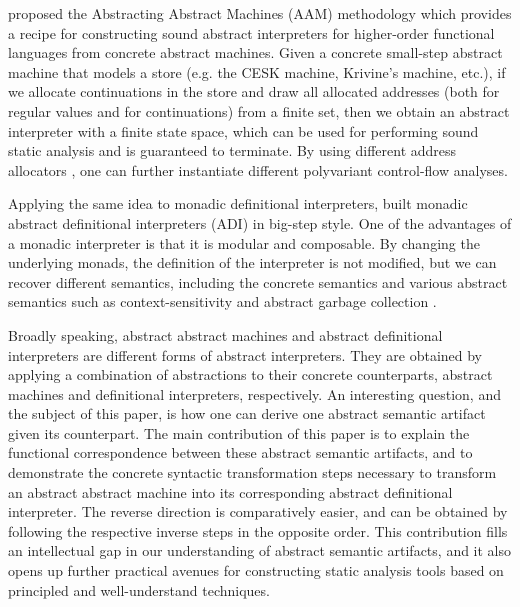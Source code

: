 \documentclass[acmsmall, review]{acmart}\settopmatter{}
\begin{document}
 proposed the Abstracting Abstract Machines (AAM)
methodology which provides a recipe for constructing sound abstract interpreters
for higher-order functional languages from concrete abstract machines.
Given a concrete small-step abstract machine that models a store 
(e.g. the CESK machine, Krivine's machine, etc.), if we allocate continuations 
in the store and draw all allocated addresses (both for regular values and 
for continuations) from a finite set, then
we obtain an abstract interpreter with a finite state space, which can be used for 
performing sound static analysis and is guaranteed to terminate.
By using different address allocators \cite{Gilray:2016:ACP:2951913.2951936},
one can further instantiate different polyvariant control-flow analyses.

Applying the same idea to monadic definitional interpreters, \citet{darais2017abstracting}
built monadic abstract definitional interpreters (ADI) in big-step style. 
One of the advantages of a monadic interpreter is
that it is modular and composable. By changing the underlying monads, the definition
of the interpreter is not modified, but we can recover different semantics, including
the concrete semantics and various abstract semantics such as context-sensitivity and
abstract garbage collection \cite{Sergey:2013:MAI:2491956.2491979}.

Broadly speaking, abstract abstract machines and abstract definitional interpreters are
different forms of abstract interpreters. They are obtained by applying a combination
of abstractions to their concrete counterparts, abstract machines and definitional
interpreters, respectively. An interesting question, and the subject of this paper, is
how one can derive one abstract semantic artifact given its counterpart.
The main contribution of this paper is to explain the functional correspondence
between these abstract semantic artifacts, and to demonstrate the concrete
syntactic transformation steps necessary to transform an abstract abstract machine 
into its corresponding abstract definitional interpreter. The reverse direction
is comparatively easier, and can be obtained by following the respective inverse 
steps in the opposite order. This contribution fills an intellectual gap in our 
understanding of abstract semantic artifacts, and it also opens up further practical 
avenues for constructing static analysis tools based on principled and well-understand
techniques.
\end{document}
